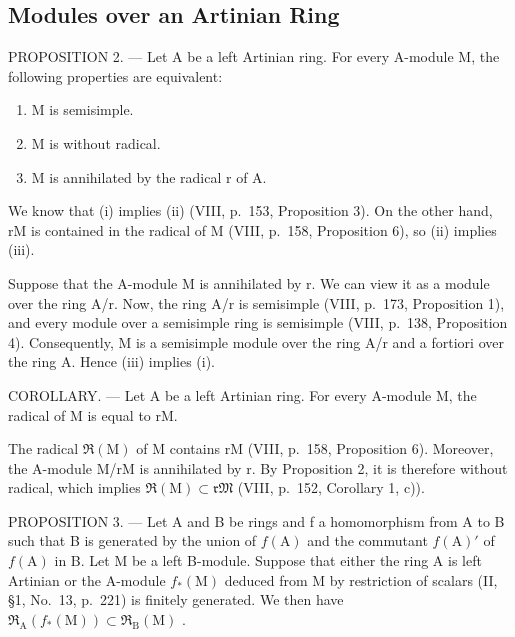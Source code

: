 \subsection{Modules over an Artinian Ring}

PROPOSITION 2. --- Let A be a left Artinian ring. For every A-module M, the following properties are equivalent:

\begin{enumerate}
\def\labelenumi{(\roman{enumi})}
\item
  M is semisimple.
\item
  M is without radical.
\item
  M is annihilated by the radical r of A.
\end{enumerate}

We know that (i) implies (ii) (VIII, p.~153, Proposition 3). On the other hand, rM is contained in the radical of M (VIII, p.~158, Proposition 6), so (ii) implies (iii).

Suppose that the A-module M is annihilated by r. We can view it as a module over the ring A/r. Now, the ring A/r is semisimple (VIII, p.~173, Proposition 1), and every module over a semisimple ring is semisimple (VIII, p.~138, Proposition 4). Consequently, M is a semisimple module over the ring A/r and a fortiori over the ring A. Hence (iii) implies (i).

COROLLARY. --- Let A be a left Artinian ring. For every A-module M, the radical of M is equal to rM.

The radical \(\Re(\mathrm{M})\) of M contains rM (VIII, p.~158, Proposition 6). Moreover, the A-module M/rM is annihilated by r. By Proposition 2, it is therefore without radical, which implies \(\Re(\mathrm{M}) \subset \mathfrak{rM}\) (VIII, p.~152, Corollary 1, c)).

PROPOSITION 3. --- Let A and B be rings and f a homomorphism from A to B such that B is generated by the union of \(f(\mathrm{A})\) and the commutant \(f(\mathrm{A})'\) of \(f(\mathrm{A})\) in B. Let M be a left B-module. Suppose that either the ring A is left Artinian or the A-module \(f_{*}(\mathrm{M})\) deduced from M by restriction of scalars (II, §1, No.~13, p.~221) is finitely generated. We then have \(\mathfrak{R}_{\mathrm{A}}(f_{*}(\mathrm{M})) \subset \mathfrak{R}_{\mathrm{B}}(\mathrm{M})\) .

